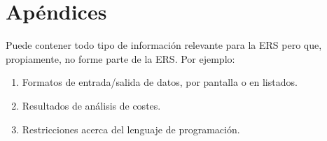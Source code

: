 \documentclass[12pt,a4paper, twosite]{article}
\begin{document}
\newpage


\section{Apéndices}
\label{sec:org75cea03}

Puede contener todo tipo de información relevante para la ERS pero
que, propiamente, no forme parte de la ERS. Por ejemplo:

\begin{enumerate}
\item Formatos de entrada/salida de datos, por pantalla o en listados.

\item Resultados de análisis de costes.

\item Restricciones acerca del lenguaje de programación.
\end{enumerate}
\end{document}
